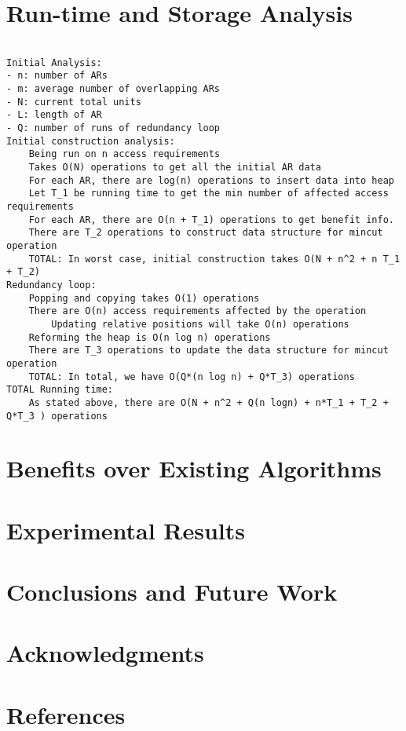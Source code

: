 \documentclass[11pt,psfig]{article}
\begin{document}
\section*{Run-time and Storage Analysis}

\begin{verbatim}

Initial Analysis:
- n: number of ARs
- m: average number of overlapping ARs
- N: current total units
- L: length of AR
- Q: number of runs of redundancy loop
Initial construction analysis:
	Being run on n access requirements
	Takes O(N) operations to get all the initial AR data
	For each AR, there are log(n) operations to insert data into heap
	Let T_1 be running time to get the min number of affected access requirements
	For each AR, there are O(n + T_1) operations to get benefit info.
	There are T_2 operations to construct data structure for mincut operation
	TOTAL: In worst case, initial construction takes O(N + n^2 + n T_1 + T_2)
Redundancy loop:
	Popping and copying takes O(1) operations
	There are O(n) access requirements affected by the operation
		Updating relative positions will take O(n) operations
	Reforming the heap is O(n log n) operations
	There are T_3 operations to update the data structure for mincut operation
	TOTAL: In total, we have O(Q*(n log n) + Q*T_3) operations
TOTAL Running time:
	As stated above, there are O(N + n^2 + Q(n logn) + n*T_1 + T_2 + Q*T_3 ) operations

\end{verbatim}

\section*{Benefits over Existing Algorithms}

\section*{Experimental Results}

\section*{Conclusions and Future Work}

\section*{Acknowledgments}

\section*{References}    

\end{document}
